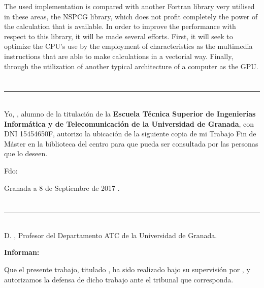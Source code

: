 The used implementation is compared with another Fortran library very utilised in these areas, the NSPCG library, which does not profit completely the power of the calculation that is available. In order to improve the performance with respect to this library, it will be made several efforts. First, it will seek to optimize the CPU’s use by the employment of characteristics as the multimedia instructions that are able to make calculations in a vectorial way. Finally, through the utilization of another typical architecture of a computer as the GPU.

\chapter*{}
\thispagestyle{empty}

\noindent\rule[-1ex]{\textwidth}{2pt}\\[4.5ex]

Yo, \textbf{\myName}, alumno de la titulación \myDegree de la \textbf{Escuela 
Técnica Superior
de Ingenierías Informática y de Telecomunicación de la Universidad de Granada}, con DNI 15454650F, autorizo la
ubicación de la siguiente copia de mi Trabajo Fin de Máster en la biblioteca 
del centro para que pueda ser consultada por las personas que lo deseen.

\vspace{6cm}

\noindent Fdo: \myName

\vspace{2cm}

\begin{flushright}
Granada a 8 de Septiembre de 2017 .
\end{flushright}


\chapter*{}
\thispagestyle{empty}

\noindent\rule[-1ex]{\textwidth}{2pt}\\[4.5ex]

D. \textbf{\myProf}, Profesor del Departamento ATC de la Universidad de Granada.

\vspace{0.5cm}

\textbf{Informan:}

\vspace{0.5cm}

Que el presente trabajo, titulado \textit{\textbf{\myTitle}},
ha sido realizado bajo su supervisión por \textbf{\myName}, y autorizamos la 
defensa de dicho trabajo ante el tribunal que corresponda.

